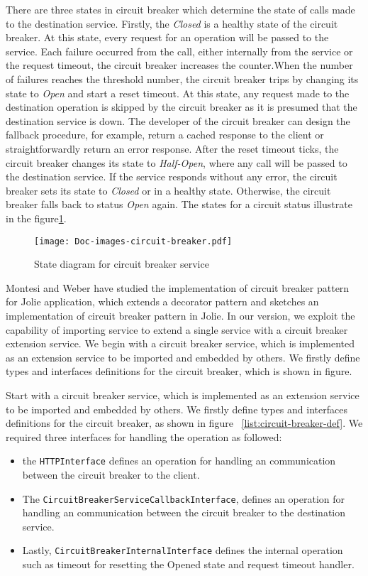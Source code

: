 There are three states in circuit breaker which determine the state of calls made to the destination service. Firstly, the \textit{Closed} is a healthy state of the circuit breaker. At this state, every request for an operation will be passed to the service. Each failure occurred from the call, either internally from the service or the request timeout, the circuit breaker increases the counter.When the number of failures reaches the threshold number, the circuit breaker trips by changing its state to \textit{Open} and start a reset timeout. At this state, any request made to the destination operation is skipped by the circuit breaker as it is presumed that the destination service is down. The developer of the circuit breaker can design the fallback procedure, for example, return a cached response to the client or straightforwardly return an error response. After the reset timeout ticks, the circuit breaker changes its state to \textit{Half-Open}, where any call will be passed to the destination service. If the service responds without any error, the circuit breaker sets its state to \textit{Closed} or in a healthy state. Otherwise, the circuit breaker falls back to status \textit{Open} again. The states for a circuit status illustrate in the figure\ref{figure:circuit-breaker-state-diagram}. 

\begin{figure}
    \centering
    \texttt{[image: Doc-images-circuit-breaker.pdf]}
    \caption{State diagram for circuit breaker service}
    \label{figure:circuit-breaker-state-diagram}
\end{figure}

Montesi and Weber have studied the implementation of circuit breaker pattern for Jolie application\cite{10.1145/3167132.3167427}, which extends a decorator pattern and sketches an implementation of circuit breaker pattern in Jolie. In our version, we exploit the capability of importing service to extend a single service with a circuit breaker extension service. We begin with a circuit breaker service, which is implemented as an extension service to be imported and embedded by others. We firstly define types and interfaces definitions for the circuit breaker, which is shown in figure.

Start with a circuit breaker service, which is implemented as an extension service to be imported and embedded by others. We firstly define types and interfaces definitions for the circuit breaker, as shown in figure ~\ref{list:circuit-breaker-def}. We required three interfaces for handling the operation as followed:
\begin{itemize}
    \item the \texttt{HTTPInterface} defines an operation for handling an communication between the circuit breaker to the client.
    \item The \texttt{CircuitBreakerServiceCallbackInterface}, defines an operation for handling an communication between the circuit breaker to the destination service.
    \item Lastly, \texttt{CircuitBreakerInternalInterface} defines the internal operation such as timeout for resetting the Opened state and request timeout handler. 
\end{itemize}

